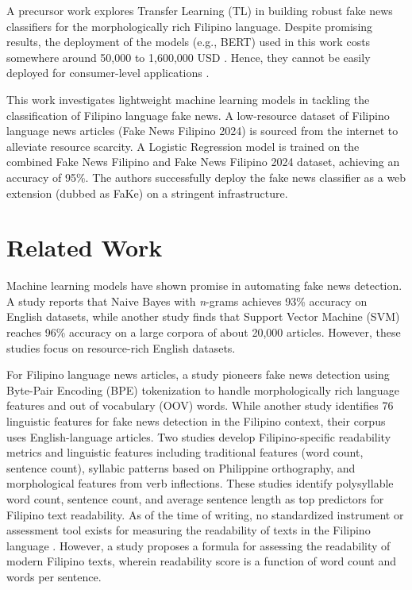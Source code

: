 \documentclass[conference]{IEEEtran}
\begin{document}
A precursor work \cite{b3} explores Transfer Learning (TL) in building robust fake news classifiers for the morphologically rich Filipino language. Despite promising results, the deployment of the models (e.g., BERT) used in this work costs somewhere around 50,000 to 1,600,000 USD \cite{b4}. Hence, they cannot be easily deployed for consumer-level applications \cite{b3, b4}.

This work investigates lightweight machine learning models in tackling the classification of Filipino language fake news. A low-resource dataset of Filipino language news articles (Fake News Filipino 2024) is sourced from the internet to alleviate resource scarcity. A Logistic Regression model is trained on the combined Fake News Filipino and Fake News Filipino 2024 dataset, achieving an accuracy of 95\%. The authors successfully deploy the fake news classifier as a web extension (dubbed as FaKe) on a stringent infrastructure.

\section{Related Work}

Machine learning models have shown promise in automating fake news detection. A study \cite{b5} reports that Naive Bayes with \textit{n}-grams achieves 93\% accuracy on English datasets, while another study \cite{b6} finds that Support Vector Machine (SVM) reaches 96\% accuracy on a large corpora of about 20,000 articles. However, these studies focus on resource-rich English datasets.

For Filipino language news articles, a study \cite{b3} pioneers fake news detection using Byte-Pair Encoding (BPE) tokenization to handle morphologically rich language features and out of vocabulary (OOV) words. While another study \cite{b7} identifies 76 linguistic features for fake news detection in the Filipino context, their corpus uses English-language articles. Two studies \cite{b8, b9} develop Filipino-specific readability metrics and linguistic features including traditional features (word count, sentence count), syllabic patterns based on Philippine orthography, and morphological features from verb inflections. These studies identify polysyllable word count, sentence count, and average sentence length as top predictors for Filipino text readability. As of the time of writing, no standardized instrument or assessment tool exists for measuring the readability of texts in the Filipino language \cite{b8}. However, a study \cite{b10} proposes a formula for assessing the readability of modern Filipino texts, wherein readability score is a function of word count and words per sentence.
\end{document}
